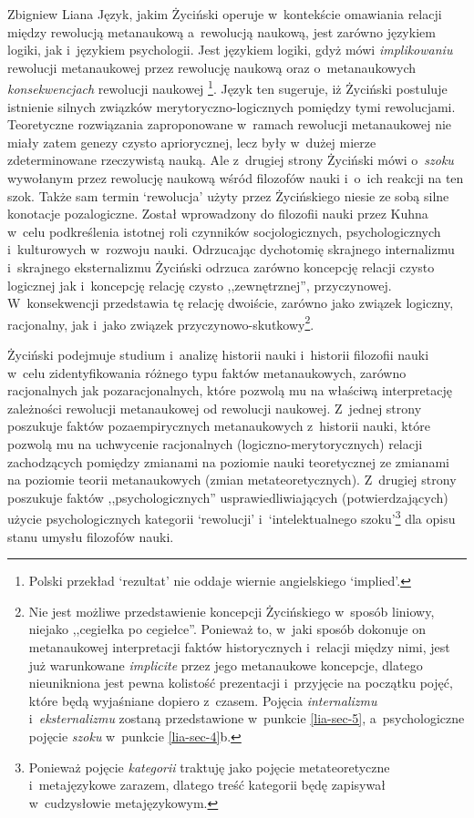 \begin{artplenv}{Zbigniew Liana}
Język, jakim Życiński operuje w~kontekście omawiania relacji między rewolucją metanaukową a~rewolucją naukową, jest
zarówno językiem logiki, jak i~językiem psychologii. Jest językiem logiki, gdyż mówi \textit{implikowaniu} rewolucji
metanaukowej przez rewolucję naukową oraz o~metanaukowych \textit{konsekwencjach} rewolucji naukowej
\parencites[s.~8.13]{zycinski_structure_1988}[s.~15.24]{zycinski_struktura_2013}\footnote{Polski przekład `rezultat' nie oddaje
wiernie angielskiego `implied'.}. Język ten sugeruje, iż Życiński postuluje istnienie silnych związków
merytoryczno-logicznych pomiędzy tymi rewolucjami. Teoretyczne rozwiązania zaproponowane w~ramach rewolucji
metanaukowej nie miały zatem genezy czysto apriorycznej, lecz były w~dużej mierze  zdeterminowane rzeczywistą nauką.
Ale z~drugiej strony Życiński mówi o~\textit{szoku} wywołanym przez rewolucję naukową wśród filozofów nauki i~o~ich
reakcji na ten szok. Także sam termin `rewolucja' użyty przez Życińskiego niesie ze sobą silne konotacje pozalogiczne.
Został wprowadzony do filozofii nauki przez Kuhna w~celu podkreślenia istotnej roli czynników socjologicznych,
psychologicznych i~kulturowych w~rozwoju nauki. Odrzucając dychotomię skrajnego internalizmu i~skrajnego eksternalizmu
Życiński odrzuca zarówno koncepcję relacji czysto logicznej jak i~koncepcję relację czysto ,,zewnętrznej'',
przyczynowej. W~konsekwencji przedstawia tę relację dwoiście, zarówno jako związek logiczny, racjonalny, jak i~jako związek
przyczynowo-skutkowy\footnote{Nie jest możliwe przedstawienie koncepcji Życińskiego w~sposób liniowy, niejako ,,cegiełka
po cegiełce''. Ponieważ to, w~jaki sposób dokonuje on metanaukowej interpretacji faktów historycznych i~relacji między
nimi, jest już warunkowane \textit{implicite} przez jego metanaukowe koncepcje, dlatego nieunikniona jest pewna kolistość
prezentacji i~przyjęcie na początku pojęć, które będą wyjaśniane dopiero z~czasem. Pojęcia \textit{internalizmu} i~\textit{eksternalizmu}
zostaną przedstawione w~punkcie \ref{lia-sec-5}, a~psychologiczne pojęcie \textit{szoku} w~punkcie \ref{lia-sec-4}b.}.

Życiński podejmuje studium i~analizę historii nauki i~historii filozofii nauki w~celu zidentyfikowania różnego typu
faktów metanaukowych, zarówno racjonalnych jak pozaracjonalnych, które pozwolą mu na właściwą interpretację zależności
rewolucji metanaukowej od rewolucji naukowej. Z~jednej strony poszukuje faktów pozaempirycznych metanaukowych z~historii
nauki, które pozwolą mu na uchwycenie racjonalnych (logiczno-merytorycznych) relacji zachodzących pomiędzy
zmianami na poziomie nauki teoretycznej ze zmianami na poziomie teorii metanaukowych (zmian metateoretycznych). Z~drugiej
strony poszukuje faktów ,,psychologicznych'' usprawiedliwiających (potwierdzających) użycie psychologicznych
kategorii `rewolucji' i~`intelektualnego szoku'\footnote{Ponieważ pojęcie \textit{kategorii} traktuję jako pojęcie
metateoretyczne i~metajęzykowe zarazem, dlatego treść kategorii będę zapisywał w~cudzysłowie metajęzykowym.} dla opisu
stanu umysłu filozofów nauki.


\end{artplenv}
